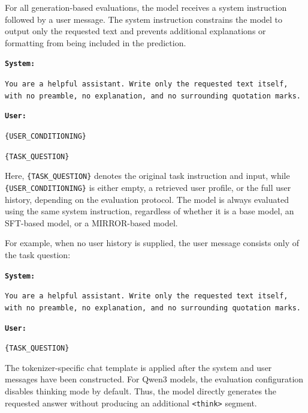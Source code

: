 \documentclass{article} %
\begin{document}
For all generation-based evaluations, the model receives a system instruction followed by a user message. The system instruction constrains the model to output only the requested text and prevents additional explanations or formatting from being included in the prediction.

\begin{tcolorbox}[
    colback=gray!5,
    colframe=black!45,
    title=Common generation prompt,
    breakable,
    left=3pt,
    right=3pt,
    top=3pt,
    bottom=3pt
]
\small
\texttt{\textbf{System:}}

\texttt{You are a helpful assistant. Write only the requested text itself, with no preamble, no explanation, and no surrounding quotation marks.}

\medskip

\texttt{\textbf{User:}}

\texttt{\{USER\_CONDITIONING\}}

\texttt{\{TASK\_QUESTION\}}
\end{tcolorbox}

Here, \texttt{\{TASK\_QUESTION\}} denotes the original task instruction and input, while \texttt{\{USER\_CONDITIONING\}} is either empty, a retrieved user profile, or the full user history, depending on the evaluation protocol. The model is always evaluated using the same system instruction, regardless of whether it is a base model, an SFT-based model, or a MIRROR-based model.

For example, when no user history is supplied, the user message consists only of the task question:

\begin{tcolorbox}[
    colback=gray!5,
    colframe=black!45,
    title=Non-personalized generation prompt,
    breakable,
    left=3pt,
    right=3pt,
    top=3pt,
    bottom=3pt
]
\small
\texttt{\textbf{System:}}

\texttt{You are a helpful assistant. Write only the requested text itself, with no preamble, no explanation, and no surrounding quotation marks.}

\medskip

\texttt{\textbf{User:}}

\texttt{\{TASK\_QUESTION\}}
\end{tcolorbox}

The tokenizer-specific chat template is applied after the system and user messages have been constructed. For Qwen3 models, the evaluation configuration disables thinking mode by default. Thus, the model directly generates the requested answer without producing an additional \texttt{<think>} segment.
\end{document}
